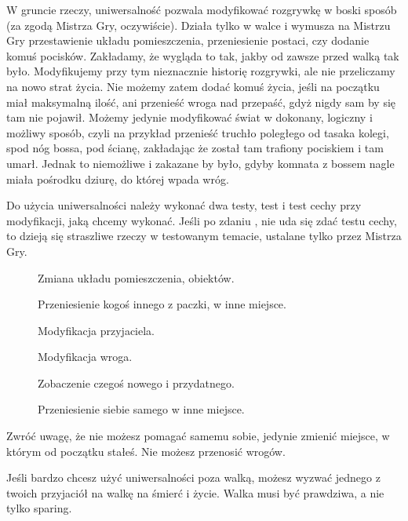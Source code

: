 W gruncie rzeczy, uniwersalność pozwala modyfikować rozgrywkę w boski sposób (za zgodą Mistrza Gry, oczywiście).
Działa tylko w walce i wymusza na Mistrzu Gry przestawienie układu pomieszczenia, przeniesienie postaci, czy dodanie komuś pocisków.
Zakładamy, że wygląda to tak, jakby od zawsze przed walką tak było. Modyfikujemy przy tym nieznacznie historię rozgrywki, ale nie przeliczamy na nowo strat życia.
Nie możemy zatem dodać komuś życia, jeśli na początku miał maksymalną ilość, ani przenieść wroga nad przepaść, gdyż nigdy sam by się tam nie pojawił.
Możemy jedynie modyfikować świat w dokonany, logiczny i możliwy sposób, czyli na przykład przenieść truchło poległego od tasaka kolegi, spod nóg bossa, pod ścianę, zakładając że został tam trafiony pociskiem i tam umarł.
Jednak to niemożliwe i zakazane by było, gdyby komnata z bossem nagle miała pośrodku dziurę, do której wpada wróg.

Do użycia uniwersalności należy wykonać dwa testy, test \abu{} i test cechy przy modyfikacji, jaką chcemy wykonać.
Jeśli po zdaniu \abu{}, nie uda się zdać testu cechy, to dzieją się straszliwe rzeczy w testowanym temacie, ustalane tylko przez Mistrza Gry.
\begin{description}
	\item[\abi{}] Zmiana układu pomieszczenia, obiektów.
	\item[\abs{}] Przeniesienie kogoś innego z paczki, w inne miejsce.
	\item[\abt{}] Modyfikacja przyjaciela.
	\item[\abh{}] Modyfikacja wroga.
	\item[\abp{}] Zobaczenie czegoś nowego i przydatnego.
	\item[\aba{}] Przeniesienie siebie samego w inne miejsce.
\end{description}
Zwróć uwagę, że nie możesz pomagać samemu sobie, jedynie zmienić miejsce, w którym od początku stałeś.
Nie możesz przenosić wrogów.

Jeśli bardzo chcesz użyć uniwersalności poza walką, możesz wyzwać jednego z twoich przyjaciół na walkę na śmierć i życie.
Walka musi być prawdziwa, a nie tylko sparing.







